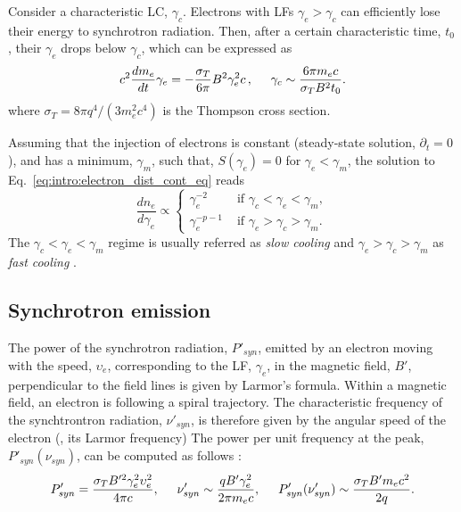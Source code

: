 Consider a characteristic \ac{LC}, $\gamma_c$. 
Electrons with \acp{LF} $\gamma_e > \gamma_c$ can efficiently lose their energy to 
synchrotron radiation. Then, after a certain characteristic time, $t_0$, 
their $\gamma_e$ drops below $\gamma_c$, which can be expressed as
%
\begin{equation}
c^2 \frac{dm_e}{dt} \gamma_e = -\frac{\sigma_T}{6\pi} B^2 \gamma_e^2 c\, ,
\hspace{5mm}
\gamma_c \sim \frac{6 \pi m_e c}{\sigma_T B^2 t_0}.
\end{equation}
%
where $\sigma_T = 8\pi q^4 / (3m_e^2c^4)$ is the Thompson cross section.


Assuming that the injection of electrons is constant (steady-state solution,
$\partial_t = 0$), and has a minimum, $\gamma_m$, such that, 
$S(\gamma_e) = 0$ for $\gamma_e < \gamma_m$, the solution to  Eq.~\eqref{eq:intro:electron_dist_cont_eq} reads 
%
\begin{equation}
\frac{dn_e}{d\gamma_e} \propto 
\begin{cases}
\gamma_e^{-2} &\text{ if } \gamma_c < \gamma_e < \gamma_m, \\
\gamma_e^{-p-1} &\text{ if } \gamma_e > \gamma_c > \gamma_m. 
\end{cases}
\label{eq:afterglow:elec_dist}
\end{equation}
%
The $\gamma_c < \gamma_e < \gamma_m$ regime is usually referred as 
\textit{slow cooling} and $\gamma_e > \gamma_c > \gamma_m$ as \textit{fast cooling} 
\citep{Sari:1997qe}.





\subsection{Synchrotron emission}

The power of the synchrotron radiation, $P'_{syn}$, emitted by an electron moving with 
the speed, $\upsilon_e$, corresponding to the \ac{LF}, $\gamma_e$, 
in the magnetic field, $B'$, perpendicular to the field lines is given by Larmor's formula.
%
Within a magnetic field, an electron is following a spiral trajectory. 
The characteristic frequency of the synchtrontron radiation, $\nu'_{syn}$, 
is therefore given by the angular speed of the electron (\eg, its Larmor frequency)
%
The power per unit frequency at the peak, $P'_{syn}(\nu_{syn})$, can be computed as 
follows \citep{RybickiLightman:1985}:
%
\begin{equation}
P'_{syn} = \frac{\sigma_T B'^2\gamma_e^2\upsilon_e^2}{4\pi c}, 
\hspace{5mm} 
\nu'_{syn} \sim \frac{q B' \gamma_e^2}{2\pi m_e c},
\hspace{5mm}
P'_{syn}(\nu_{syn}') \sim \frac{\sigma_T B' m_e c^2}{2 q}.
\end{equation}
%



